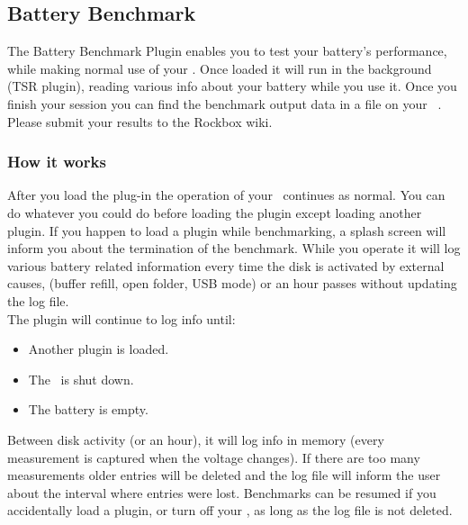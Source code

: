 \subsection{Battery Benchmark}
The Battery Benchmark Plugin enables you to test your battery's performance,
while making normal use of your \dap. Once loaded it will run in the
background (TSR plugin), reading various info about your battery while you use
it. Once you finish your session you can find the benchmark output data in a
file on your \dap\ .
Please submit your results to the Rockbox wiki.

\subsubsection{How it works}
After you load the plug-in the operation of your \dap\ continues as normal.
You can do whatever you could do before loading the plugin except loading
another plugin. If you happen to load a plugin while benchmarking, a splash
screen will inform you about the termination of the benchmark.
While you operate it will log various battery related information every time
the disk is activated by external causes, (buffer refill, open folder,
USB mode) or an hour passes without updating the log file.\\
The plugin will continue to log info until:

\begin{itemize}
\item Another plugin is loaded.
\item The \dap\ is shut down.
\item The battery is empty.
\end{itemize}
Between disk activity (or an hour), it will log info in memory (every
measurement is captured when the voltage changes). If there are too many
measurements older entries will be deleted and the log file will inform the
user about the interval where entries were lost. Benchmarks can be resumed if
you accidentally load a plugin, or turn off your \dap, as long as the log
file  is not deleted. 

